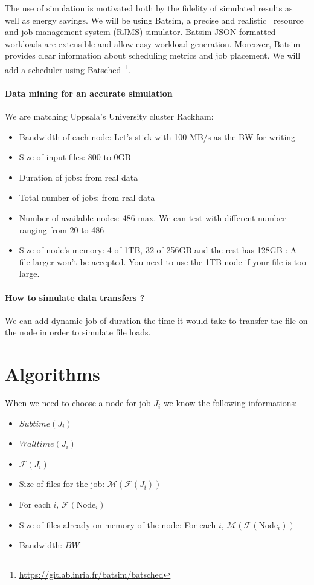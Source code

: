 \documentclass[a4paper]{article}
\newcommand{\Node}[1]{\ensuremath{\mathrm{Node}_{#1}}\xspace}
\newcommand{\inputs}{\ensuremath{\mathcal{F}}\xspace}
\newcommand{\memory}{\ensuremath{\mathcal{M}}\xspace}
\newcommand{\bandwidth}{\mathit{BW}\xspace}
\newcommand{\submissiontime}{\mathit{Subtime}\xspace}
\newcommand{\walltime}{\mathit{Walltime}\xspace}
\begin{document}
The use of simulation is motivated both by the fidelity of simulated results as well as energy savings. 
We will be using Batsim, a precise and realistic~\cite{Batsim} resource and job management system (RJMS) simulator.
Batsim JSON-formatted workloads are extensible and allow easy workload generation. 
Moreover, Batsim provides clear information about scheduling metrics and job placement.
We will add a scheduler using Batsched~\footnote{\url{https://gitlab.inria.fr/batsim/batsched}}.

\paragraph{Data mining for an accurate simulation}
We are matching Uppsala's University cluster Rackham:
\begin{itemize}
	\item	Bandwidth of each node: Let's stick with 100 MB/s as the BW for writing
	\item	Size of input files: 800 to 0GB
	\item	Duration of jobs: from real data
	\item	Total number of jobs: from real data
	\item	Number of available nodes: 486 max. We can test with different number ranging from 20 to 486
	\item	Size of node's memory: 4 of 1TB, 32 of 256GB and the rest has 128GB : A file larger won't be accepted. You need to use the 1TB node if your file is too large.
\end{itemize}

\paragraph{How to simulate data transfers ?}
We can add dynamic job of duration the time it would take to transfer the file on the node in order
to simulate file loads.

\section{Algorithms}

When we need to choose a node for job $J_i$ we know the following informations:
\begin{itemize}
	\item $\submissiontime(J_i)$
	\item $\walltime(J_i)$
	\item $\inputs(J_i)$
	\item Size of files for the job: $\memory(\inputs(J_i))$
	\item For each $i$, $\inputs(\Node{i})$
	\item Size of files already on memory of the node: For each $i$, $\memory(\inputs(\Node{i}))$
	\item Bandwidth: $\bandwidth$
\end{itemize}
\end{document}

